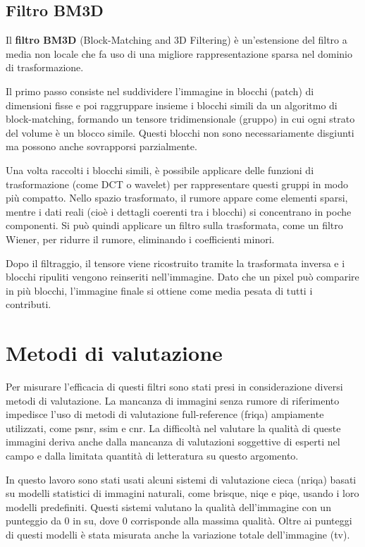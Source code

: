 \documentclass[../main.tex]{subfiles}
\begin{document}
\subsection{Filtro BM3D}

Il \textbf{filtro BM3D} (Block-Matching and 3D Filtering) è un'estensione del filtro a media non locale che fa uso di una migliore rappresentazione sparsa nel dominio di trasformazione.\cite{manjon_2008}

Il primo passo consiste nel suddividere l’immagine in blocchi (patch) di dimensioni fisse e poi raggruppare insieme i blocchi simili da un algoritmo di block-matching, formando un tensore tridimensionale (gruppo) in cui ogni strato del volume è un blocco simile. Questi blocchi non sono necessariamente disgiunti ma possono anche sovrapporsi parzialmente.

Una volta raccolti i blocchi simili, è possibile applicare delle funzioni di trasformazione (come DCT o wavelet) per rappresentare questi gruppi in modo più compatto. Nello spazio trasformato, il rumore appare come elementi sparsi, mentre i dati reali (cioè i dettagli coerenti tra i blocchi) si concentrano in poche componenti. Si può quindi applicare un filtro sulla trasformata, come un filtro Wiener, per ridurre il rumore, eliminando i coefficienti minori.\cite{maggioni_2013}

Dopo il filtraggio, il tensore viene ricostruito tramite la trasformata inversa e i blocchi ripuliti vengono reinseriti nell’immagine. Dato che un pixel può comparire in più blocchi, l’immagine finale si ottiene come media pesata di tutti i contributi.\cite{dabov_2007}

\section{Metodi di valutazione}

Per misurare l'efficacia di questi filtri sono stati presi in considerazione diversi metodi di valutazione. La mancanza di immagini senza rumore di riferimento impedisce l'uso di metodi di valutazione full-reference (\acrshort{friqa}) ampiamente utilizzati, come \acrshort{psnr}\cite{korhonen_2012}, \acrshort{ssim}\cite{wang_2004} e \acrshort{cnr}.\cite{rodriguez_2018} La difficoltà nel valutare la qualità di queste immagini deriva anche dalla mancanza di valutazioni soggettive di esperti nel campo e dalla limitata quantità di letteratura su questo argomento.

In questo lavoro sono stati usati alcuni sistemi di valutazione cieca (\acrshort{nriqa}) basati su modelli statistici di immagini naturali, come \acrshort{brisque}\cite{mittal_2011}, \acrshort{niqe}\cite{mittal_2013} e \acrshort{piqe}\cite{venkatanath_2015}, usando i loro modelli predefiniti. Questi sistemi valutano la qualità dell'immagine con un punteggio da 0 in su, dove 0 corrisponde alla massima qualità. Oltre ai punteggi di questi modelli è stata misurata anche la variazione totale dell'immagine (\acrshort{tv}).
\end{document}

